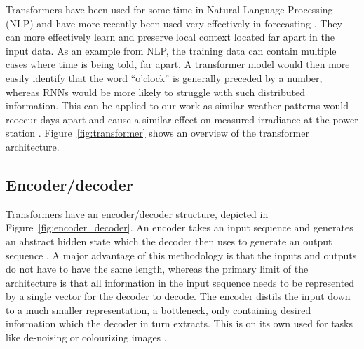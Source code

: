  
Transformers have been used for some time in Natural Language Processing (NLP) and have more recently been used very effectively in forecasting \cite{vaswani_attention_2017}. They can more effectively learn and preserve local context located far apart in the input data. As an example from NLP, the training data can contain multiple cases where time is being told, far apart. A transformer model would then more easily identify that the word \enquote{o’clock} is generally preceded by a number, whereas RNNs would be more likely to struggle with such distributed information. This can be applied to our work as similar weather patterns would reoccur days apart and cause a similar effect on measured irradiance at the power station \cite{lim_time_2021}. Figure~\ref{fig:transformer} shows an overview of the transformer architecture.


\newpage

\subsection{Encoder/decoder}
Transformers have an encoder/decoder structure, depicted in Figure~\ref{fig:encoder_decoder}. An encoder takes an input sequence and generates an abstract hidden state which the decoder then uses to generate an output sequence \cite{vaswani_attention_2017}. A major advantage of this methodology is that the inputs and outputs do not have to have the same length, whereas the primary limit of the architecture is that all information in the input sequence needs to be represented by a single vector for the decoder to decode. The encoder distils the input down to a much smaller representation, a bottleneck, only containing desired information which the decoder in turn extracts. This is on its own used for tasks like de-noising or colourizing images \cite{nechu_what_2020}. 

